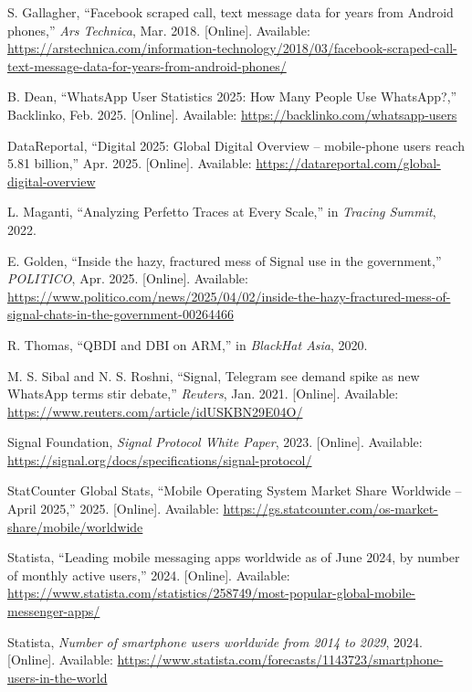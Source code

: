 \documentclass[a4paper,12pt]{report}
\begin{document}
\begin{thebibliography}{99}
S. Gallagher, “Facebook scraped call, text message data for years from Android phones,” \emph{Ars Technica}, Mar. 2018. [Online]. Available: \url{https://arstechnica.com/information-technology/2018/03/facebook-scraped-call-text-message-data-for-years-from-android-phones/}

B. Dean, “WhatsApp User Statistics 2025: How Many People Use WhatsApp?,” Backlinko, Feb. 2025. [Online]. Available: \url{https://backlinko.com/whatsapp-users}

DataReportal, “Digital 2025: Global Digital Overview – mobile‐phone users reach 5.81 billion,” Apr. 2025. [Online]. Available: \url{https://datareportal.com/global-digital-overview}

L. Maganti, “Analyzing Perfetto Traces at Every Scale,” in \emph{Tracing Summit}, 2022.

E. Golden, “Inside the hazy, fractured mess of Signal use in the government,” \emph{POLITICO}, Apr. 2025. [Online]. Available: \url{https://www.politico.com/news/2025/04/02/inside-the-hazy-fractured-mess-of-signal-chats-in-the-government-00264466}

R. Thomas, “QBDI and DBI on ARM,” in \emph{BlackHat Asia}, 2020.

M. S. Sibal and N. S. Roshni, “Signal, Telegram see demand spike as new WhatsApp terms stir debate,” \emph{Reuters}, Jan. 2021. [Online]. Available: \url{https://www.reuters.com/article/idUSKBN29E04O/}

Signal Foundation, \emph{Signal Protocol White Paper}, 2023. [Online]. Available: \url{https://signal.org/docs/specifications/signal-protocol/}

StatCounter Global Stats, “Mobile Operating System Market Share Worldwide – April 2025,” 2025. [Online]. Available: \url{https://gs.statcounter.com/os-market-share/mobile/worldwide}

Statista, “Leading mobile messaging apps worldwide as of June 2024, by number of monthly active users,” 2024. [Online]. Available: \url{https://www.statista.com/statistics/258749/most-popular-global-mobile-messenger-apps/}

Statista, \emph{Number of smartphone users worldwide from 2014 to 2029}, 2024. [Online]. Available: \url{https://www.statista.com/forecasts/1143723/smartphone-users-in-the-world}


\end{thebibliography}
\end{document}
